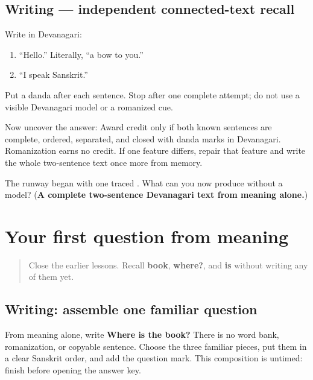 \subsection*{Writing — independent connected-text recall}
Write in Devanagari:

\begin{enumerate}
\raggedright
  \item “Hello.” Literally, “a bow to you.”
  \item “I speak Sanskrit.”
\end{enumerate}

Put a danda after each sentence. Stop after one complete attempt; do not use a visible Devanagari model or a romanized cue.

Now uncover the answer: \textbf{   } Award credit only if both known sentences are complete, ordered, separated, and closed with danda marks in Devanagari. Romanization earns no credit. If one feature differs, repair that feature and write the whole two-sentence text once more from memory.

\begin{tcolorbox}[breakable,colback=teal!4,colframe=teal!35!black,title={Before you move on}]
The runway began with one traced \textbf{}. What can you now produce without a model? (\textbf{A complete two-sentence Devanagari text from meaning alone.})
\end{tcolorbox}
\section[(controlled location question)]{Your first question from meaning}

\label{lesson:SA-W65-kutra-controlled-question}



\begin{quote}
Close the earlier lessons. Recall \textbf{book}, \textbf{where?}, and \textbf{is} without writing any of them yet.
\end{quote}

\subsection*{Writing: assemble one familiar question}
From meaning alone, write \textbf{Where is the book?} There is no word bank, romanization, or copyable sentence. Choose the three familiar pieces, put them in a clear Sanskrit order, and add the question mark. This composition is untimed: finish before opening the answer key.


